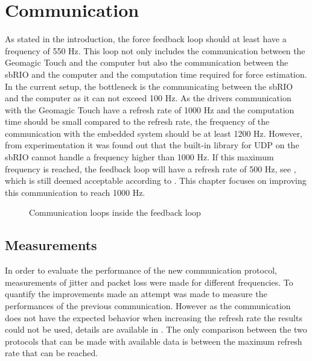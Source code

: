 \chapter{Communication}\label{cha:communication}

As stated in the introduction, the force feedback loop should at least have a frequency of 550 Hz. This loop not only includes the communication between the Geomagic Touch and the computer but also the communication between the sbRIO and the computer and the computation time required for force estimation. In the current setup, the bottleneck is the communicating between the sbRIO and the computer as it can not exceed 100 Hz. As the drivers communication with the Geomagic Touch have a refresh rate of 1000 Hz and the computation time should be small compared to the refresh rate, the frequency of the communication with the embedded system should be at least 1200 Hz. However, from experimentation it was found out that the built-in library for UDP on the sbRIO cannot handle a frequency higher than 1000 Hz. If this maximum frequency is reached, the feedback loop will have a refresh rate of 500 Hz, see , which is still deemed acceptable according to \cite{coles2011role}.  This chapter focuses on improving this communication to reach 1000 Hz.

\begin{figure}[H]
	\centering
	
	\caption{Communication loops inside the feedback loop}
	\label{fig:speed_graph}
\end{figure}











\section{Measurements}

In order to evaluate the performance of the new communication protocol, measurements of jitter and packet loss were made for different frequencies. To quantify the improvements made an attempt was made to measure the performances of the previous communication. However as the communication does not have the expected behavior when increasing the refresh rate the results could not be used, details are available in . The only comparison between the two protocols that can be made with available data is between the maximum refresh rate that can be reached.

